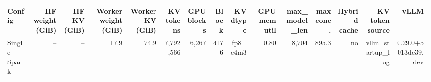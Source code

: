 \begin{tabular}{l r r r r r r r r r r r r r r }
\toprule
Config & HF weight (GiB) & HF KV (GiB) & Worker weight (GiB) & Worker KV (GiB) & KV tokens & GPU blocks & Block & KV dtype & GPU mem util & max\_model\_len & max conc. & Hybrid cache & KV token source & vLLM \\
\midrule
Single Spark & -- & -- & 17.9 & 74.9 & 7,792,566 & 6,267 & 4176 & fp8\_e4m3 & 0.80 & 8,704 & 895.3 & no & vllm\_startup\_log & 0.29.0+5013de39.dev \\
\bottomrule
\end{tabular}

